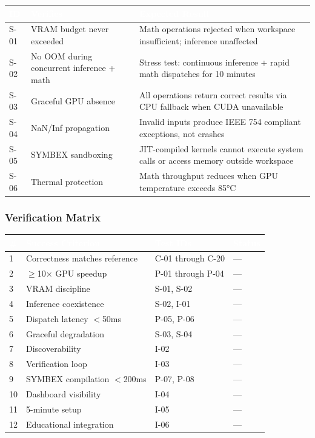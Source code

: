 \documentclass[11pt,letterpaper]{article}
\newcommand{\tableheader}[1]{\textbf{\sffamily\textcolor{white}{#1}}}
\begin{document}
\begin{center}
\begin{tabularx}{\textwidth}{C{1cm}L{3cm}X}
\toprule
{}
\tableheader{ID} & \tableheader{Verifies} & \tableheader{Expected Result} \\
\midrule
S-01 & VRAM budget never exceeded & Math operations rejected when workspace insufficient; inference unaffected \\
S-02 & No OOM during concurrent inference + math & Stress test: continuous inference + rapid math dispatches for 10 minutes \\
S-03 & Graceful GPU absence & All operations return correct results via CPU fallback when CUDA unavailable \\
S-04 & NaN/Inf propagation & Invalid inputs produce IEEE 754 compliant exceptions, not crashes \\
S-05 & SYMBEX sandboxing & JIT-compiled kernels cannot execute system calls or access memory outside workspace \\
S-06 & Thermal protection & Math throughput reduces when GPU temperature exceeds 85°C \\
\bottomrule
\end{tabularx}
\end{center}

\subsubsection{Verification Matrix}

\begin{center}
\begin{tabularx}{\textwidth}{C{0.8cm}L{5cm}L{2.5cm}C{1.2cm}}
\toprule
{}
\tableheader{\#} & \tableheader{Success Criterion} & \tableheader{Test IDs} & \tableheader{Status} \\
 & Correctness matches reference & C-01 through C-20 & --- \\
2 & $\geq$10× GPU speedup & P-01 through P-04 & --- \\
3 & VRAM discipline & S-01, S-02 & --- \\
4 & Inference coexistence & S-02, I-01 & --- \\
5 & Dispatch latency $<$50ms & P-05, P-06 & --- \\
6 & Graceful degradation & S-03, S-04 & --- \\
7 & Discoverability & I-02 & --- \\
8 & Verification loop & I-03 & --- \\
9 & SYMBEX compilation $<$200ms & P-07, P-08 & --- \\
10 & Dashboard visibility & I-04 & --- \\
11 & 5-minute setup & I-05 & --- \\
12 & Educational integration & I-06 & --- \\
\bottomrule
\end{tabularx}
\end{center}
\end{document}
